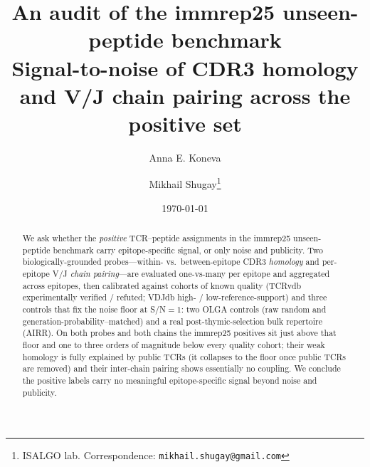 \documentclass[11pt]{article}
\title{\textbf{An audit of the immrep25 unseen-peptide benchmark}\\[2pt]
\large Signal-to-noise of CDR3 homology and V/J chain pairing across the positive set}
\author{Anna E. Koneva \and Mikhail Shugay\thanks{ISALGO lab.
Correspondence: \texttt{mikhail.shugay@gmail.com}}}
\date{\today}
\begin{document}
\maketitle

\begin{abstract}
\noindent We ask whether the \emph{positive} TCR--peptide assignments in the
immrep25 unseen-peptide benchmark carry epitope-specific signal, or only noise and
publicity. Two biologically-grounded probes---within- vs.\ between-epitope CDR3
\emph{homology} and per-epitope V/J \emph{chain pairing}---are evaluated one-vs-many
per epitope and aggregated across epitopes, then calibrated against cohorts of known
quality (TCRvdb experimentally verified / refuted; VDJdb high- / low-reference-support)
and three controls that fix the noise floor at S/N${=}1$: two OLGA controls (raw random
and generation-probability--matched) and a real post-thymic-selection bulk repertoire
(AIRR). On both probes and both chains the immrep25 positives sit just above that floor
and one to three orders of magnitude below every quality cohort; their weak homology is
fully explained by public TCRs (it collapses to the floor once public TCRs are removed)
and their inter-chain pairing shows essentially no coupling. We conclude the positive labels carry no meaningful epitope-specific
signal beyond noise and publicity.
\end{abstract}










\end{document}
